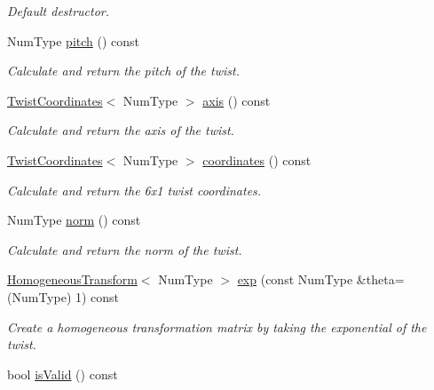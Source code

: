 \begin{DoxyCompactItemize}
\begin{DoxyCompactList}\small\item\em Default destructor. \end{DoxyCompactList}\item 
Num\+Type \hyperlink{singletonscrews_1_1_twist_ac7983ec6acc61283dcb361c39749e83c}{pitch} () const 
\begin{DoxyCompactList}\small\item\em Calculate and return the pitch of the twist. \end{DoxyCompactList}\item 
\hyperlink{singletonscrews_1_1_vector6}{Twist\+Coordinates}$<$ Num\+Type $>$ \hyperlink{singletonscrews_1_1_twist_afd7bd1a3b654dbb8411195ced209c5f0}{axis} () const 
\begin{DoxyCompactList}\small\item\em Calculate and return the axis of the twist. \end{DoxyCompactList}\item 
\hyperlink{singletonscrews_1_1_vector6}{Twist\+Coordinates}$<$ Num\+Type $>$ \hyperlink{singletonscrews_1_1_twist_a23049d6d5757c3d79d6e0b46ab09bcb9}{coordinates} () const 
\begin{DoxyCompactList}\small\item\em Calculate and return the 6x1 twist coordinates. \end{DoxyCompactList}\item 
Num\+Type \hyperlink{singletonscrews_1_1_twist_ad94400fd342b1945bde5ea1d3babe59f}{norm} () const 
\begin{DoxyCompactList}\small\item\em Calculate and return the norm of the twist. \end{DoxyCompactList}\item 
\hyperlink{classscrews_1_1_homogeneous_transform}{Homogeneous\+Transform}$<$ Num\+Type $>$ \hyperlink{singletonscrews_1_1_twist_a19f92b83f476ad9a0c2bf69fe70a0fc7}{exp} (const Num\+Type \&theta=(Num\+Type) 1) const 
\begin{DoxyCompactList}\small\item\em Create a homogeneous transformation matrix by taking the exponential of the twist. \end{DoxyCompactList}\item 
\hypertarget{singletonscrews_1_1_twist_adc46cc120386e2f40aa2d4181d4d2dd0}{bool \hyperlink{singletonscrews_1_1_twist_adc46cc120386e2f40aa2d4181d4d2dd0}{is\+Valid} () const }\label{singletonscrews_1_1_twist_adc46cc120386e2f40aa2d4181d4d2dd0}


\end{DoxyCompactItemize}
